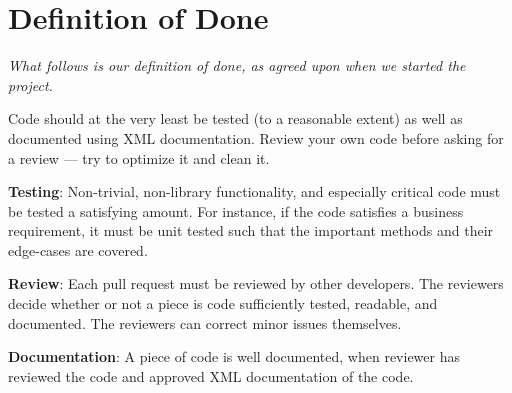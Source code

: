 \chapter{Definition of Done}\label{sec:definitionOfDone}
\textit{What follows is our definition of done, as agreed upon when we started the project.}

Code should at the very least be tested (to a reasonable extent) as well as documented using XML documentation. Review your own code before asking for a review --- try to optimize it and clean it.

\textbf{Testing}: Non-trivial, non-library functionality, and especially critical code must be tested a satisfying amount. For instance, if the code satisfies a business requirement, it must be unit tested such that the important methods and their edge-cases are covered.  

\textbf{Review}: Each pull request must be reviewed by other developers. The reviewers decide whether or not a piece is code sufficiently tested, readable, and documented. The reviewers can correct minor issues themselves. 

\textbf{Documentation}: A piece of code is well documented, when reviewer has reviewed the code and approved XML documentation of the code.